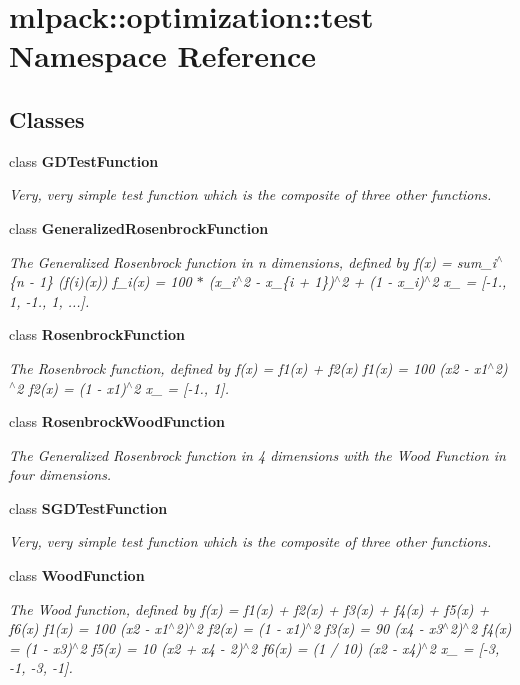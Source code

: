 \section{mlpack\+:\+:optimization\+:\+:test Namespace Reference}
\label{namespacemlpack_1_1optimization_1_1test}
\subsection*{Classes}
\begin{DoxyCompactItemize}
\item 
class {\bf G\+D\+Test\+Function}
\begin{DoxyCompactList}\small\item\em Very, very simple test function which is the composite of three other functions. \end{DoxyCompactList}\item 
class {\bf Generalized\+Rosenbrock\+Function}
\begin{DoxyCompactList}\small\item\em The Generalized Rosenbrock function in n dimensions, defined by f(x) = sum\+\_\+i$^\wedge$\{n -\/ 1\} (f(i)(x)) f\+\_\+i(x) = 100 $\ast$ (x\+\_\+i$^\wedge$2 -\/ x\+\_\+\{i + 1\})$^\wedge$2 + (1 -\/ x\+\_\+i)$^\wedge$2 x\+\_ = [-\/1., 1, -\/1., 1, ...]. \end{DoxyCompactList}\item 
class {\bf Rosenbrock\+Function}
\begin{DoxyCompactList}\small\item\em The Rosenbrock function, defined by f(x) = f1(x) + f2(x) f1(x) = 100 (x2 -\/ x1$^\wedge$2)$^\wedge$2 f2(x) = (1 -\/ x1)$^\wedge$2 x\+\_ = [-\/1., 1]. \end{DoxyCompactList}\item 
class {\bf Rosenbrock\+Wood\+Function}
\begin{DoxyCompactList}\small\item\em The Generalized Rosenbrock function in 4 dimensions with the Wood Function in four dimensions. \end{DoxyCompactList}\item 
class {\bf S\+G\+D\+Test\+Function}
\begin{DoxyCompactList}\small\item\em Very, very simple test function which is the composite of three other functions. \end{DoxyCompactList}\item 
class {\bf Wood\+Function}
\begin{DoxyCompactList}\small\item\em The Wood function, defined by f(x) = f1(x) + f2(x) + f3(x) + f4(x) + f5(x) + f6(x) f1(x) = 100 (x2 -\/ x1$^\wedge$2)$^\wedge$2 f2(x) = (1 -\/ x1)$^\wedge$2 f3(x) = 90 (x4 -\/ x3$^\wedge$2)$^\wedge$2 f4(x) = (1 -\/ x3)$^\wedge$2 f5(x) = 10 (x2 + x4 -\/ 2)$^\wedge$2 f6(x) = (1 / 10) (x2 -\/ x4)$^\wedge$2 x\+\_ = [-\/3, -\/1, -\/3, -\/1]. \end{DoxyCompactList}\end{DoxyCompactItemize}
